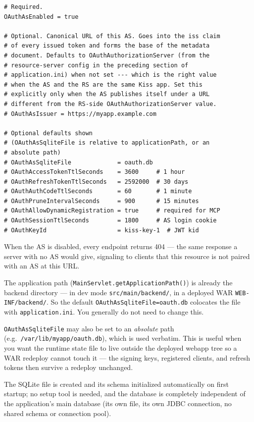 \begin{lstlisting}[style=ini]
# Required.
OAuthAsEnabled = true

# Optional. Canonical URL of this AS. Goes into the iss claim
# of every issued token and forms the base of the metadata
# document. Defaults to OAuthAuthorizationServer (from the
# resource-server config in the preceding section of
# application.ini) when not set --- which is the right value
# when the AS and the RS are the same Kiss app. Set this
# explicitly only when the AS publishes itself under a URL
# different from the RS-side OAuthAuthorizationServer value.
# OAuthAsIssuer = https://myapp.example.com

# Optional defaults shown
# (OAuthAsSqliteFile is relative to applicationPath, or an
# absolute path)
# OAuthAsSqliteFile             = oauth.db
# OAuthAccessTokenTtlSeconds    = 3600     # 1 hour
# OAuthRefreshTokenTtlSeconds   = 2592000  # 30 days
# OAuthAuthCodeTtlSeconds       = 60       # 1 minute
# OAuthPruneIntervalSeconds     = 900      # 15 minutes
# OAuthAllowDynamicRegistration = true     # required for MCP
# OAuthSessionTtlSeconds        = 1800     # AS login cookie
# OAuthKeyId                    = kiss-key-1  # JWT kid
\end{lstlisting}

When the AS is disabled, every endpoint returns 404 --- the same response a server with no AS would give, signaling to clients that this resource is not paired with an AS at this URL.

\begin{tipbox}
The application path (\texttt{MainServlet.getApplicationPath()}) is already the backend directory --- in dev mode \texttt{src/main/backend/}, in a deployed WAR \texttt{WEB-INF/backend/}.  So the default \texttt{OAuthAsSqliteFile=oauth.db} colocates the file with \texttt{application.ini}.  You generally do not need to change this.

\texttt{OAuthAsSqliteFile} may also be set to an \emph{absolute} path (e.g.\ \texttt{/var/lib/myapp/oauth.db}), which is used verbatim.  This is useful when you want the runtime state file to live outside the deployed webapp tree so a WAR redeploy cannot touch it --- the signing keys, registered clients, and refresh tokens then survive a redeploy unchanged.

The SQLite file is created and its schema initialized automatically on first startup; no setup tool is needed, and the database is completely independent of the application's main database (its own file, its own JDBC connection, no shared schema or connection pool).
\end{tipbox}

